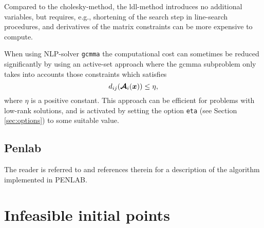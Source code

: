 \documentclass{article}
\newcommand{\bm}[1]{\mbox{\boldmath $#1$}}
\begin{document}
Compared to the cholesky-method, the ldl-method introduces no additional variables, but requires, e.g., shortening of the search step in line-search procedures, and derivatives of the matrix constraints can be more expensive to compute. 

When using NLP-solver \texttt{gcmma} the computational cost can sometimes be reduced significantly by using an active-set approach \cite{Bogani:2009} where the gcmma subproblem only takes into accounts those constraints which satisfies 
\begin{equation}\nonumber
d_{ij}(\bm{\mathcal{A}}_{i}(\bm{x})) \leq \eta,
\end{equation}
where $\eta$ is a positive constant. This approach can be efficient for problems with low-rank solutions, and is activated by setting the option \texttt{eta} (see Section \ref{sec:options}) to some suitable value.



\subsection{Penlab}

The reader is referred to \cite{Fiala:2013} and references therein for a description of the algorithm implemented in PENLAB.



\section{Infeasible initial points}
\label{sec:infeasible}
\end{document}
